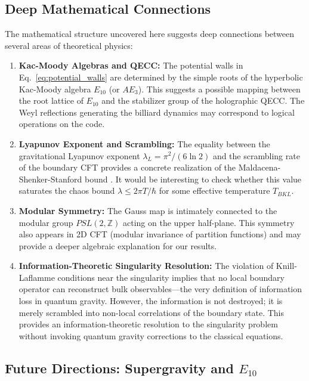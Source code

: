 \documentclass[aps,prd,reprint,nofootinbib,amsmath,amssymb,amsfonts]{revtex4-2}
\begin{document}
\subsection{Deep Mathematical Connections}

The mathematical structure uncovered here suggests deep connections between several areas of theoretical physics:

\begin{enumerate}
    \item \textbf{Kac-Moody Algebras and QECC:} The potential walls in Eq.~\eqref{eq:potential_walls} are determined by the simple roots of the hyperbolic Kac-Moody algebra $E_{10}$ (or $AE_3$). This suggests a possible mapping between the root lattice of $E_{10}$ and the stabilizer group of the holographic QECC. The Weyl reflections generating the billiard dynamics may correspond to logical operations on the code.
    
    \item \textbf{Lyapunov Exponent and Scrambling:} The equality between the gravitational Lyapunov exponent $\lambda_L = \pi^2/(6\ln 2)$ and the scrambling rate of the boundary CFT provides a concrete realization of the Maldacena-Shenker-Stanford bound \cite{Maldacena2016}. It would be interesting to check whether this value saturates the chaos bound $\lambda \le 2\pi T/\hbar$ for some effective temperature $T_{BKL}$.
    
    \item \textbf{Modular Symmetry:} The Gauss map is intimately connected to the modular group $PSL(2,\mathbb{Z})$ acting on the upper half-plane. This symmetry also appears in 2D CFT (modular invariance of partition functions) and may provide a deeper algebraic explanation for our results.
    
    \item \textbf{Information-Theoretic Singularity Resolution:} The violation of Knill-Laflamme conditions near the singularity implies that no local boundary operator can reconstruct bulk observables---the very definition of information loss in quantum gravity. However, the information is not destroyed; it is merely scrambled into non-local correlations of the boundary state. This provides an information-theoretic resolution to the singularity problem without invoking quantum gravity corrections to the classical equations.
\end{enumerate}

\subsection{Future Directions: Supergravity and \texorpdfstring{$E_{10}$}{E10}}
\end{document}
